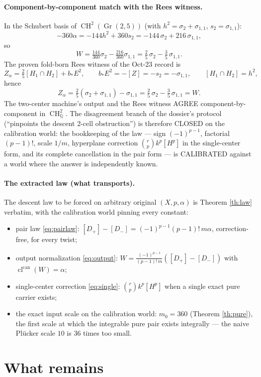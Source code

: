 \documentclass[11pt]{article}
\theoremstyle{definition}
\newcommand{\Gr}{\operatorname{Gr}}
\newcommand{\cl}{\operatorname{cl}^{\operatorname{can}}}
\newcommand{\CH}{\operatorname{CH}}
\begin{document}
\paragraph{Component-by-component match with the Rees witness.}
In the Schubert basis of $\CH^2(\Gr(2,5))$ (with
$h^2=\sigma_2+\sigma_{1,1}$, $s_2=\sigma_{1,1}$):
\[
-360\alpha=-144h^2+360s_2=-144\,\sigma_2+216\,\sigma_{1,1},
\]
so
\[
W=\tfrac{144}{360}\sigma_2-\tfrac{216}{360}\sigma_{1,1}
=\tfrac25\,\sigma_2-\tfrac35\,\sigma_{1,1}.
\]
The proven fold-born Rees witness of the Oct-23 record is
\[
Z_\alpha=\tfrac25[H_1\cap H_2]+b_*E^2,
\qquad b_*E^2=-[Z]=-s_2=-\sigma_{1,1},
\qquad [H_1\cap H_2]=h^2,
\]
hence
\[
Z_\alpha=\tfrac25(\sigma_2+\sigma_{1,1})-\sigma_{1,1}
=\tfrac25\,\sigma_2-\tfrac35\,\sigma_{1,1}=W .
\]
The two-center machine's output and the Rees witness AGREE
component-by-component in $\CH^2_{\mathbb Q}$. The disagreement branch
of the dossier's protocol (``pinpoints the descent 2-cell
obstruction'') is therefore CLOSED on the calibration world: the
bookkeeping of the law --- sign $(-1)^{p-1}$, factorial $(p-1)!$,
scale $1/m$, hyperplane correction $\binom rp k^p[H^p]$ in the
single-center form, and its complete cancellation in the pair form ---
is CALIBRATED against a world where the answer is independently known.

\paragraph{The extracted law (what transports).}
The descent law to be forced on arbitrary original $(X,p,\alpha)$ is
Theorem \ref{th:law} verbatim, with the calibration world pinning
every constant:
\begin{itemize}
\item pair law \eqref{eq:pairlaw}: $[D_+]-[D_-]=(-1)^{p-1}(p-1)!\,m\alpha$,
correction-free, for every twist;
\item output normalization \eqref{eq:output}:
$W=\tfrac{(-1)^{p-1}}{(p-1)!\,m}([D_+]-[D_-])$ with $\cl(W)=\alpha$;
\item single-center correction \eqref{eq:single}:
$\binom rp k^p[H^p]$ when a single exact pure carrier exists;
\item the exact input scale on the calibration world: $m_0=360$
(Theorem \ref{th:pure}), the first scale at which the integrable pure
pair exists integrally --- the naive Pl\"ucker scale $10$ is
$36$ times too small.
\end{itemize}

\section{What remains}
\end{document}
